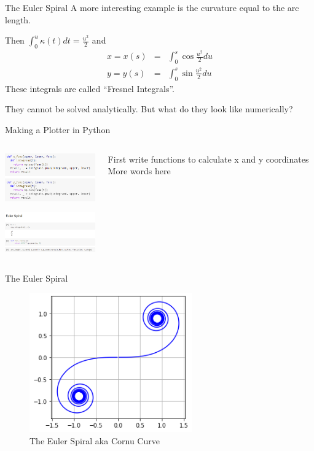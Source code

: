 \documentclass{beamer}
\begin{document}
\begin{frame}{The Euler Spiral}
	A more interesting example is the curvature equal to the arc length. 
	
	\begin{center}
	\end{center}
	Then 
	$ \int_0^u \kappa(t) dt = \frac{u^2}{2} $ and
	\begin{eqnarray*}
		x = x(s) &=& \int_{0}^{s} \cos \frac{u^2}{2} du\\
		y = y(s) &=& \int_{0}^{s} \sin \frac{u^2}{2} du
	\end{eqnarray*}
	These integrals are called ``Fresnel Integrals''. 
	
	They cannot be solved analytically. But what do they look like numerically?
\end{frame}

\begin{frame}{Making a Plotter in Python}
	\begin{columns}
		\begin{column}{0.5\textwidth}
			\includegraphics[width=50mm, scale=0.5]{code_1.png}
			
			\includegraphics[width=50mm, scale=0.5]{code_2.png}
		\end{column}
		\begin{column}{0.5\textwidth}
			First write functions to calculate x and y coordinates 
			More words here
			
		\end{column}
	\end{columns}
\end{frame}


\begin{frame}{The Euler Spiral}
	\begin{figure}
		\caption{The Euler Spiral aka Cornu Curve}
		\centering
		\includegraphics[width=70mm, scale=0.5]{euler_spiral.png}
	\end{figure}
	
\end{frame}
\end{document}
